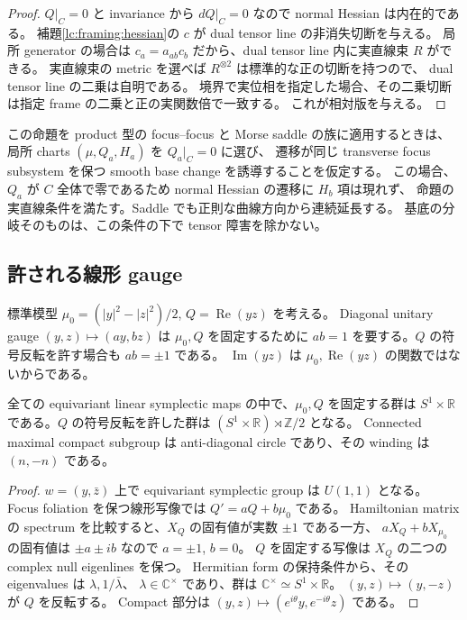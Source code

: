 \begin{proof}
$Q|_C=0$ と invariance から $dQ|_C=0$ なので normal Hessian は内在的である。
補題\ref{lc:framing:hessian}の $c$ が dual tensor line の非消失切断を与える。
局所 generator の場合は $c_a=a_{ab}c_b$ だから、dual tensor line 内に実直線束 $R$ ができる。
実直線束の metric を選べば $R^{\otimes2}$ は標準的な正の切断を持つので、
dual tensor line の二乗は自明である。
境界で実位相を指定した場合、その二乗切断は指定 frame の二乗と正の実関数倍で一致する。
これが相対版を与える。
\end{proof}

この命題を product 型の focus--focus と Morse saddle の族に適用するときは、
局所 charts $(\mu,Q_a,H_a)$ を $Q_a|_C=0$ に選び、
遷移が同じ transverse focus subsystem を保つ smooth base change を誘導することを仮定する。
この場合、$Q_a$ が $C$ 全体で零であるため normal Hessian の遷移に $H_b$ 項は現れず、
命題の実直線条件を満たす。Saddle でも正則な曲線方向から連続延長する。
基底の分岐そのものは、この条件の下で tensor 障害を除かない。

\subsection{許される線形 gauge}

標準模型 $\mu_0=(|y|^2-|z|^2)/2$, $Q=\operatorname{Re}(yz)$ を考える。
Diagonal unitary gauge $(y,z)\mapsto(ay,bz)$ は $\mu_0,Q$ を固定するために
$ab=1$ を要する。$Q$ の符号反転を許す場合も $ab=\pm1$ である。
$\operatorname{Im}(yz)$ は $\mu_0,\operatorname{Re}(yz)$ の関数ではないからである。

\begin{lemma}\label{lc:framing:normalizer}
全ての equivariant linear symplectic maps の中で、$\mu_0,Q$ を固定する群は
$S^1\times\mathbb R$ である。$Q$ の符号反転を許した群は
$(S^1\times\mathbb R)\rtimes\mathbb Z/2$ となる。
Connected maximal compact subgroup は anti-diagonal circle であり、その winding は $(n,-n)$ である。
\end{lemma}

\begin{proof}
$w=(y,\bar z)$ 上で equivariant symplectic group は $U(1,1)$ となる。
Focus foliation を保つ線形写像では $Q'=aQ+b\mu_0$ である。
Hamiltonian matrix の spectrum を比較すると、$X_Q$ の固有値が実数 $\pm1$ である一方、
$aX_Q+bX_{\mu_0}$ の固有値は $\pm a\pm ib$ なので $a=\pm1$, $b=0$。
$Q$ を固定する写像は $X_Q$ の二つの complex null eigenlines を保つ。
Hermitian form の保持条件から、その eigenvalues は $\lambda,1/\bar\lambda$、
$\lambda\in\mathbb C^\times$ であり、群は $\mathbb C^\times\simeq S^1\times\mathbb R$。
$(y,z)\mapsto(y,-z)$ が $Q$ を反転する。
Compact 部分は $(y,z)\mapsto(e^{i\theta}y,e^{-i\theta}z)$ である。
\end{proof}

